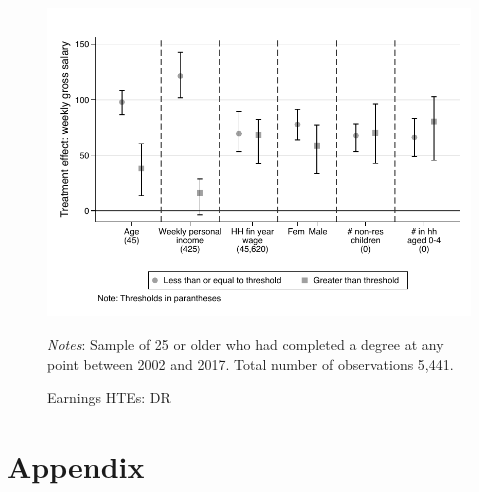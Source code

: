 \documentclass[12pt, a4paper]{article}
\begin{document}
\begin{figure}[htbp]
\centering
\caption{Earnings HTEs: DR}
\vspace{0.5cm}
  \label{fig:htedr}
    \includegraphics{_figures/hte_earnings_GL_100_DR.pdf}
\parbox{1\textwidth}{\footnotesize{\textit{Notes}: Sample of 25 or older who had completed a degree at any point between 2002 and 2017. Total number of observations 5,441.}}
\end{figure}



\clearpage




\clearpage
\section{Appendix}
%
%
\end{document}
